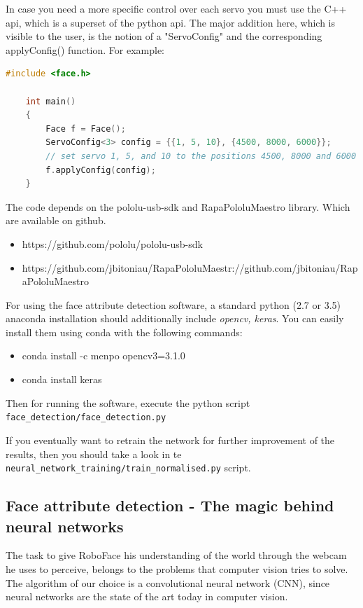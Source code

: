 \documentclass[12.5pt]{scrartcl}
\begin{document}
    In case you need a more specific control over each servo you must use the C++ api, which is a superset of the python api.
    The major addition here, which is visible to the user, is the notion of a "ServoConfig" and the corresponding applyConfig() function.
    For example:
    \begin{lstlisting}[language=C++]
    #include <face.h>

    int main()
    {
        Face f = Face();
        ServoConfig<3> config = {{1, 5, 10}, {4500, 8000, 6000}};
        // set servo 1, 5, and 10 to the positions 4500, 8000 and 6000
        f.applyConfig(config);
    }
    \end{lstlisting}

    The code depends on the pololu-usb-sdk and RapaPololuMaestro library. Which are available on github.
    \begin{itemize}
    \item https://github.com/pololu/pololu-usb-sdk
    \item https://github.com/jbitoniau/RapaPololuMaestr://github.com/jbitoniau/RapaPololuMaestro
    \end{itemize}

	For using the face attribute detection software, a standard python (2.7 or 3.5) anaconda installation should additionally include \textit{opencv, keras}. You can easily install them using conda with the following commands:
	\begin{itemize}
	\item conda install -c menpo opencv3=3.1.0
	\item conda install keras
	\end{itemize}
	Then for running the software, execute the python script \texttt{face\_detection/face\_detection.py}
	
	If you eventually want to retrain the network for further improvement of the results, then you should take a look in te \texttt{neural\_network\_training/train\_normalised.py} script.
	\subsection{Face attribute detection - The magic behind neural networks}
	The task to give RoboFace his understanding of the world through the webcam he uses to perceive, belongs to the problems that computer vision tries to solve. The algorithm of our choice is a convolutional neural network (CNN), since neural networks are the state of the art today in computer vision.
	
\end{document}

